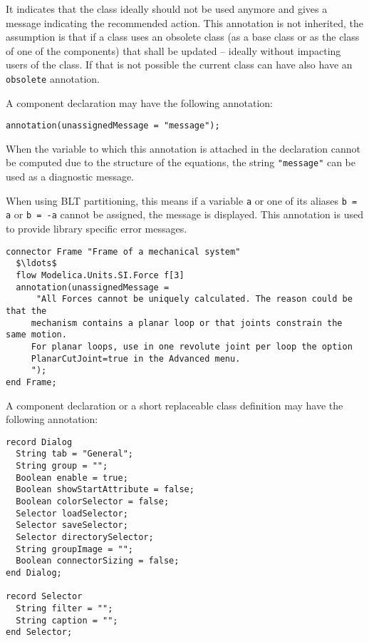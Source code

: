 It indicates that the class ideally should not be used anymore and gives a message indicating the recommended action.
This annotation is not inherited, the assumption is that if a class uses an obsolete class (as a base class or as the class of one of the components) that shall be updated -- ideally without impacting users of the class.
If that is not possible the current class can have also have an \lstinline!obsolete! annotation.

A component declaration may have the following annotation:
\begin{lstlisting}[language=modelica]
annotation(unassignedMessage = "message");
\end{lstlisting}%

When the variable to which this annotation is attached in the declaration cannot be computed due to the structure of the equations, the string \lstinline!"message"! can be used as a diagnostic message.

\begin{nonnormative}
When using BLT partitioning, this means if a variable \lstinline!a! or one of its aliases \lstinline!b = a! or \lstinline!b = -a! cannot be assigned, the message is displayed.
This annotation is used to provide library specific error messages.
\end{nonnormative}

\begin{example}
\begin{lstlisting}[language=modelica]
connector Frame "Frame of a mechanical system"
  $\ldots$
  flow Modelica.Units.SI.Force f[3]
  annotation(unassignedMessage =
      "All Forces cannot be uniquely calculated. The reason could be that the
     mechanism contains a planar loop or that joints constrain the same motion.
     For planar loops, use in one revolute joint per loop the option
     PlanarCutJoint=true in the Advanced menu.
     ");
end Frame;
\end{lstlisting}
\end{example}

A component declaration or a short replaceable class definition may have the following annotation:
\begin{lstlisting}[language=modelica]
record Dialog
  String tab = "General";
  String group = "";
  Boolean enable = true;
  Boolean showStartAttribute = false;
  Boolean colorSelector = false;
  Selector loadSelector;
  Selector saveSelector;
  Selector directorySelector;
  String groupImage = "";
  Boolean connectorSizing = false;
end Dialog;

record Selector
  String filter = "";
  String caption = "";
end Selector;
\end{lstlisting}%

